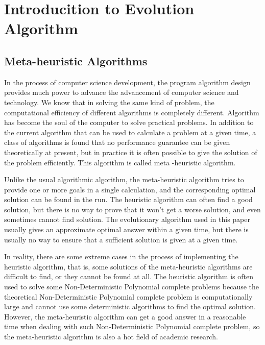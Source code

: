 
\section{Introducition to Evolution Algorithm}
\subsection{Meta-heuristic Algorithms}
%

In the process of computer science development, the program algorithm design 
provides much power to advance the advancement of computer science and 
technology. We know that in solving the same kind of problem, the 
computational efficiency of different algorithms is completely different. 
Algorithm has become the soul of the computer to solve practical problems. In 
addition to the current algorithm that can be used to calculate a problem at 
a given time, a class of algorithms is found that no performance guarantee 
can be given theoretically at present, but in practice it is often possible 
to give the solution of the problem efficiently. This algorithm is called meta
-heuristic algorithm.   

Unlike the usual algorithmic algorithm, the meta-heuristic algorithm tries to 
provide one or more goals in a single calculation, and the corresponding 
optimal solution can be found in the run. The heuristic algorithm can often 
find a good solution, but there is no way to prove that it won’t get a worse 
solution, and even sometimes cannot find solution. The evolutionary algorithm 
used in this paper usually gives an approximate optimal answer within a given 
time, but there is usually no way to ensure that a sufficient solution is 
given at a given time.

In reality, there are some extreme cases in the process of implementing the 
heuristic algorithm, that is, some solutions of the meta-heuristic algorithms 
are difficult to find, or they cannot be found at all. The heuristic 
algorithm is often used to solve some Non-Deterministic Polynomial complete 
problems because the theoretical Non-Deterministic Polynomial complete 
problem is computationally large and cannot use some deterministic algorithms 
to find the optimal solution. However, the meta-heuristic algorithm can get a 
good answer in a reasonable time when dealing with such Non-Deterministic 
Polynomial complete problem, so the meta-heuristic algorithm is also a hot 
field of academic research.

